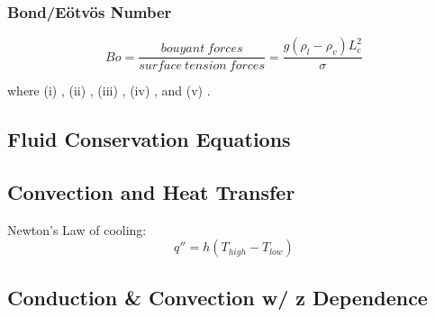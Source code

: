 \documentclass{article}
\begin{document}
\subsubsection{Bond/Eötvös Number}\label{sec:bo}
\begin{equation}
    Bo = \frac{bouyant\ forces}{surface\ tension\ forces} =
    \frac{g \left(\rho_l - \rho_v \right) L_c^2}{\sigma}
\end{equation}

where (i) \gravity, (ii) \liquiddensity, (iii) \vapordensity, (iv) \characteristiclength, and (v) \surfacetension.

\subsection{Fluid Conservation Equations}
\subsection{Convection and Heat Transfer}
Newton's Law of cooling:
\begin{equation}
    q'' = h (T_{high} - T_{low})
\end{equation}

\subsection{Conduction \& Convection w/ z Dependence}
\end{document}
